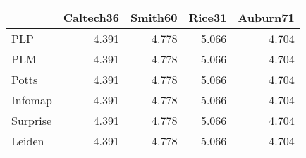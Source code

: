 \begin{tabular}{lrrrr}
\toprule
{} & Caltech36 & Smith60 & Rice31 & Auburn71 \\
\midrule
PLP      &     4.391 &   4.778 &  5.066 &    4.704 \\
PLM      &     4.391 &   4.778 &  5.066 &    4.704 \\
Potts    &     4.391 &   4.778 &  5.066 &    4.704 \\
Infomap  &     4.391 &   4.778 &  5.066 &    4.704 \\
Surprise &     4.391 &   4.778 &  5.066 &    4.704 \\
Leiden   &     4.391 &   4.778 &  5.066 &    4.704 \\
\bottomrule
\end{tabular}
